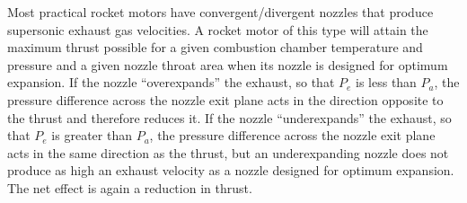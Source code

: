 Most practical rocket motors have convergent/divergent nozzles that produce supersonic exhaust gas
velocities. A rocket motor of this type will attain the maximum thrust possible for a given
combustion chamber temperature and pressure and a given nozzle throat area when its nozzle is
designed for optimum expansion. If the nozzle ``overexpands'' the exhaust, so that $P_e$ is less
than $P_a$, the pressure difference across the nozzle exit plane acts in the direction opposite to
the thrust and therefore reduces it. If the nozzle ``underexpands'' the exhaust, so that $P_e$ is
greater than $P_a$, the pressure difference across the nozzle exit plane acts in the same
direction as the thrust, but an underexpanding nozzle does not produce as high an exhaust velocity
as a nozzle designed for optimum expansion. The net effect is again a reduction in thrust.

